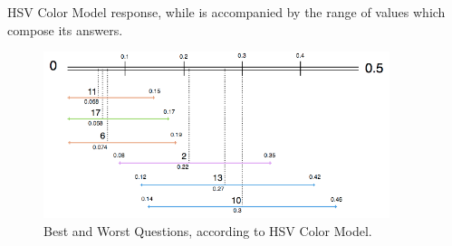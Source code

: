 HSV Color Model response, while is accompanied by the range of values which compose its answers. \par
%
\begin{figure}[!htbp]
  \centering
  \includegraphics[width=0.9\textwidth]{images/results/hsv_questions_analysis.png}
  \caption[Best and Worst Questions, according to HSV Color Model.]{Best and Worst Questions, according to HSV Color Model.}
  \label{fig:hsv_analysis}
\end{figure}
%
%
